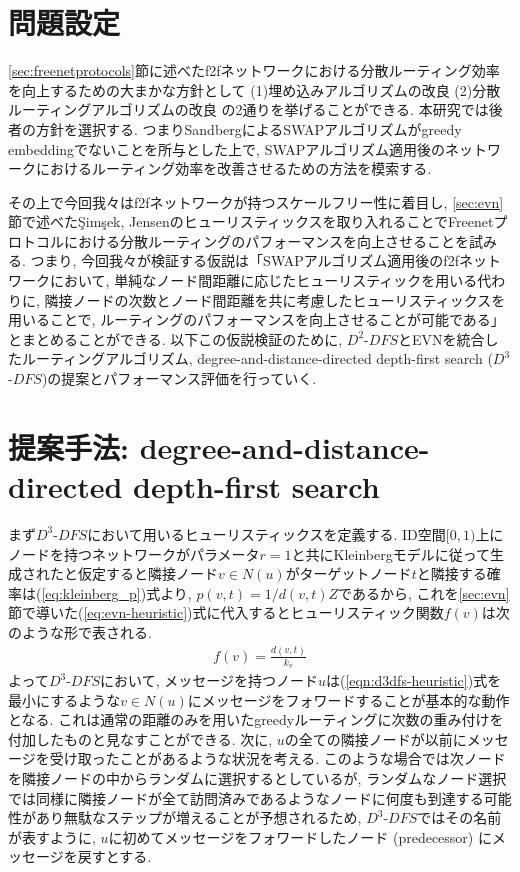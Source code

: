 \documentclass[dvipdfmx]{ampbt}
\begin{document}
\section{問題設定}
\ref{sec:freenetprotocols}節に述べた\acrshort{f2f}ネットワークにおける分散ルーティング効率を向上するための大まかな方針として (1)埋め込みアルゴリズムの改良 (2)分散ルーティングアルゴリズムの改良 の2通りを挙げることができる. 本研究では後者の方針を選択する. つまりSandbergによるSWAPアルゴリズムがgreedy embeddingでないことを所与とした上で, SWAPアルゴリズム適用後のネットワークにおけるルーティング効率を改善させるための方法を模索する.

その上で今回我々は\acrshort{f2f}ネットワークが持つスケールフリー性に着目し, \ref{sec:evn}節で述べた{\c{S}}im{\c{s}}ek, Jensenのヒューリスティックスを取り入れることでFreenetプロトコルにおける分散ルーティングのパフォーマンスを向上させることを試みる. つまり, 今回我々が検証する仮説は「SWAPアルゴリズム適用後の\acrshort{f2f}ネットワークにおいて, 単純なノード間距離に応じたヒューリスティックを用いる代わりに, 隣接ノードの次数とノード間距離を共に考慮したヒューリスティックスを用いることで, ルーティングのパフォーマンスを向上させることが可能である」とまとめることができる. 以下この仮説検証のために, $D^2$-$DFS$とEVNを統合したルーティングアルゴリズム, degree-and-distance-directed depth-first search ($D^3$-$DFS$)の提案とパフォーマンス評価を行っていく.

\section{提案手法: degree-and-distance-directed depth-first search}
まず$D^3$-$DFS$において用いるヒューリスティックスを定義する. ID空間$[0,1)$上にノードを持つネットワークがパラメータ$r=1$と共にKleinbergモデルに従って生成されたと仮定すると隣接ノード$v \in N(u)$がターゲットノード$t$と隣接する確率は(\ref{eq:kleinberg_p})式より, $p(v,t) = 1/d(v,t)Z$であるから, これを\ref{sec:evn}節で導いた(\ref{eq:evn-heuristic})式に代入するとヒューリスティック関数$f(v)$は次のような形で表される.
\begin{eqnarray}
f(v) = \frac{d(v,t)}{k_v} \label{eqn:d3dfs-heuristic}
\end{eqnarray}
よって$D^3$-$DFS$において, メッセージを持つノード$u$は(\ref{eqn:d3dfs-heuristic})式を最小にするような$v \in N(u)$にメッセージをフォワードすることが基本的な動作となる. これは通常の距離のみを用いたgreedyルーティングに次数の重み付けを付加したものと見なすことができる. 
次に, $u$の全ての隣接ノードが以前にメッセージを受け取ったことがあるような状況を考える. このような場合\cite{simsek2008navigating}では次ノードを隣接ノードの中からランダムに選択するとしているが, ランダムなノード選択では同様に隣接ノードが全て訪問済みであるようなノードに何度も到達する可能性があり無駄なステップが増えることが予想されるため, $D^3$-$DFS$ではその名前が表すように, $u$に初めてメッセージをフォワードしたノード (predecessor) にメッセージを戻すとする.
\end{document}
